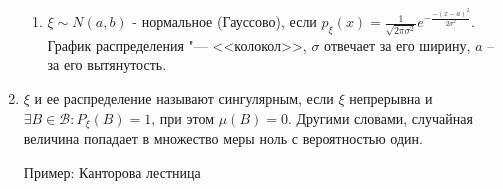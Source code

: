 \begin{enumerate}[label=\Roman*.]
\begin{enumerate}[label=\arabic*.]
    \item $\xi \sim N(a, b)$ - нормальное (Гауссово), если $p_{\xi}(x)= \frac{1}{\sqrt{2 \pi \sigma^2}} e^{-\frac{-(x-a)^2}{2\sigma^2}}$.
    График распределения "--- <<колокол>>, $\sigma$ отвечает за его ширину, $a$ -- за его вытянутость.

    \end{enumerate}
    
    \item
    \begin{Def}
        $\xi$ и ее распределение называют сингулярным, если $\xi$ непрерывна и $\exists B \in \mathcal{B}\colon P_{\xi}(B) = 1$, при этом $\mu(B) = 0$.
        Другими словами, случайная величина попадает в множество меры ноль с вероятностью один.
    \end{Def}
    Пример: Канторова лестница
\end{enumerate}